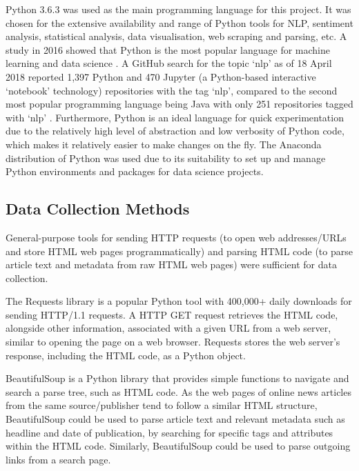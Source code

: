 \documentclass{report}
\begin{document}
Python 3.6.3 \cite{Python} was used as the main programming language for this project.
It was chosen for the extensive availability and range of Python tools for NLP, sentiment analysis, statistical analysis, data visualisation, web scraping and parsing, etc.
A study in 2016 showed that Python is the most popular language for machine learning and data science \cite{puget2016most}.
A GitHub search for the topic `nlp' as of 18 April 2018 reported 1,397 Python and 470 Jupyter (a Python-based interactive `notebook' technology) repositories with the tag `nlp', compared to the second most popular programming language being Java with only 251 repositories tagged with `nlp' \cite{GitHubNLP}.
Furthermore, Python is an ideal language for quick experimentation due to the relatively high level of abstraction and low verbosity of Python code, which makes it relatively easier to make changes on the fly.
The Anaconda distribution of Python \cite{Anaconda} was used due to its suitability to set up and manage Python environments and packages for data science projects.

\subsection{Data Collection Methods} \label{tc-data-collection}
General-purpose tools for sending HTTP requests (to open web addresses/URLs and store HTML web pages programmatically) and parsing HTML code (to parse article text and metadata from raw HTML web pages) were sufficient for data collection.

The Requests library \cite{Requests} is a popular Python tool with 400,000+ daily downloads for sending HTTP/1.1 requests.
A HTTP GET request retrieves the HTML code, alongside other information, associated with a given URL from a web server, similar to opening the page on a web browser. 
Requests stores the web server's response, including the HTML code, as a Python object.

BeautifulSoup \cite{BeautifulSoup} is a Python library that provides simple functions to navigate and search a parse tree, such as HTML code.
As the web pages of online news articles from the same source/publisher tend to follow a similar HTML structure, BeautifulSoup could be used to parse article text and relevant metadata such as headline and date of publication, by searching for specific tags and attributes within the HTML code.
Similarly, BeautifulSoup could be used to parse outgoing links from a search page.
\end{document}
